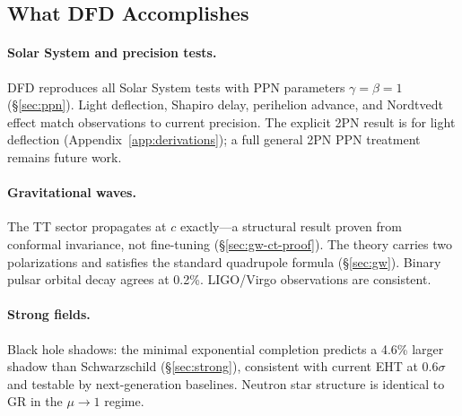 \subsection{What DFD Accomplishes}\label{sec:conclusions-accomplishes}

\paragraph{Solar System and precision tests.}
DFD reproduces all Solar System tests with PPN parameters $\gamma = \beta = 1$ (\S\ref{sec:ppn}). Light deflection, Shapiro delay, perihelion advance, and Nordtvedt effect match observations to current precision.  The explicit 2PN result is for light deflection (Appendix~\ref{app:derivations}); a full general 2PN PPN treatment remains future work.

\paragraph{Gravitational waves.}
The TT sector propagates at $c$ exactly---a structural result proven from conformal invariance, not fine-tuning (\S\ref{sec:gw-ct-proof}). The theory carries two polarizations and satisfies the standard quadrupole formula (\S\ref{sec:gw}). Binary pulsar orbital decay agrees at 0.2\%. LIGO/Virgo observations are consistent.

\paragraph{Strong fields.}
Black hole shadows: the minimal exponential completion predicts a 4.6\% larger shadow than Schwarzschild (\S\ref{sec:strong}), consistent with current EHT at $0.6\sigma$ and testable by next-generation baselines. Neutron star structure is identical to GR in the $\mu\to 1$ regime.

